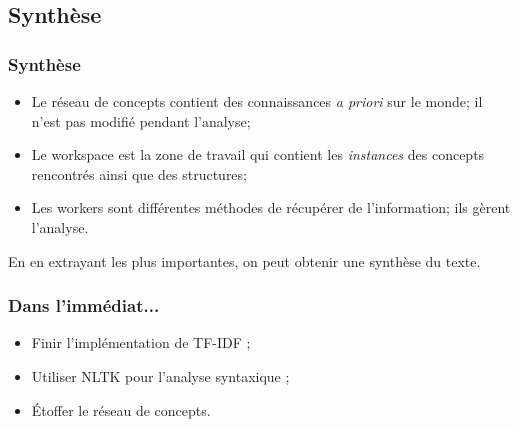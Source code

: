 \documentclass{beamer}
\begin{document}
    \subsection{Synthèse}
        \begin{frame}
        \frametitle{Synthèse}
            \begin{itemize}
                \item Le réseau de concepts contient des connaissances \textit{a priori} sur le monde; il n'est pas modifié pendant l'analyse;
                \item Le workspace est la zone de travail qui contient les \textit{instances} des concepts rencontrés ainsi que des structures;
                \item Les workers sont différentes méthodes de récupérer de l'information; ils gèrent l'analyse.
            \end{itemize}

            En en extrayant les plus importantes, on peut obtenir une synthèse du texte.
        \end{frame}

\begin{frame}
	\frametitle{Dans l'immédiat...}
	\begin{itemize}
		\item Finir l'implémentation de TF-IDF ;
		\item Utiliser NLTK pour l'analyse syntaxique ;
		\item Étoffer le réseau de concepts.
	\end{itemize}
\end{frame}
\end{document}
